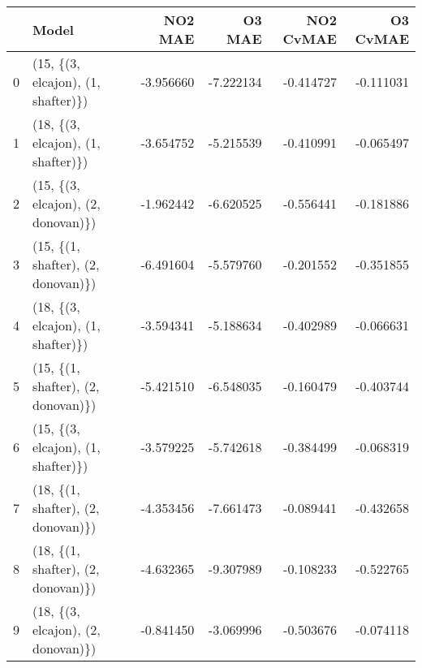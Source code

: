 \begin{tabular}{llrrrr}
\toprule
{} &                               Model &   NO2 MAE &    O3 MAE &  NO2 CvMAE &  O3 CvMAE \\
\midrule
0 &  (15, \{(3, elcajon), (1, shafter)\}) & -3.956660 & -7.222134 &  -0.414727 & -0.111031 \\
1 &  (18, \{(3, elcajon), (1, shafter)\}) & -3.654752 & -5.215539 &  -0.410991 & -0.065497 \\
2 &  (15, \{(3, elcajon), (2, donovan)\}) & -1.962442 & -6.620525 &  -0.556441 & -0.181886 \\
3 &  (15, \{(1, shafter), (2, donovan)\}) & -6.491604 & -5.579760 &  -0.201552 & -0.351855 \\
4 &  (18, \{(3, elcajon), (1, shafter)\}) & -3.594341 & -5.188634 &  -0.402989 & -0.066631 \\
5 &  (15, \{(1, shafter), (2, donovan)\}) & -5.421510 & -6.548035 &  -0.160479 & -0.403744 \\
6 &  (15, \{(3, elcajon), (1, shafter)\}) & -3.579225 & -5.742618 &  -0.384499 & -0.068319 \\
7 &  (18, \{(1, shafter), (2, donovan)\}) & -4.353456 & -7.661473 &  -0.089441 & -0.432658 \\
8 &  (18, \{(1, shafter), (2, donovan)\}) & -4.632365 & -9.307989 &  -0.108233 & -0.522765 \\
9 &  (18, \{(3, elcajon), (2, donovan)\}) & -0.841450 & -3.069996 &  -0.503676 & -0.074118 \\
\bottomrule
\end{tabular}
